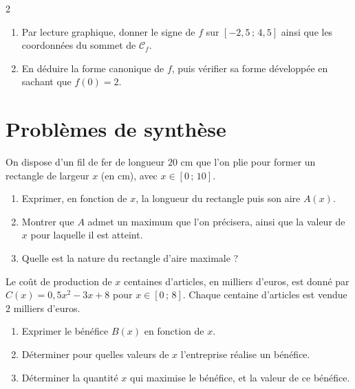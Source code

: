 \documentclass[10pt,a4paper]{article}
\begin{document}
\begin{multicols}{2}
\begin{exo}
\begin{center}
\end{center}

\begin{enumerate}[leftmargin=*]
    \item Par lecture graphique, donner le signe de $f$ sur $[-2{,}5\,;\,4{,}5]$ ainsi que les coordonnées du sommet de $\mathcal{C}_f$.
    \item En déduire la forme canonique de $f$, puis vérifier sa forme développée en sachant que $f(0)=2$.
\end{enumerate}
\end{exo}

\section{Problèmes de synthèse}

\begin{exo}
On dispose d'un fil de fer de longueur $20$ cm que l'on plie pour former un rectangle de largeur $x$ (en cm), avec $x \in [0\,;\,10]$.
\begin{enumerate}[leftmargin=*]
    \item Exprimer, en fonction de $x$, la longueur du rectangle puis son aire $A(x)$.
    \item Montrer que $A$ admet un maximum que l'on précisera, ainsi que la valeur de $x$ pour laquelle il est atteint.
    \item Quelle est la nature du rectangle d'aire maximale ?
\end{enumerate}
\end{exo}

\begin{exo}
Le coût de production de $x$ centaines d'articles, en milliers d'euros, est donné par $C(x) = 0{,}5x^2 - 3x + 8$ pour $x \in [0\,;\,8]$. Chaque centaine d'articles est vendue $2$ milliers d'euros.
\begin{enumerate}[leftmargin=*]
    \item Exprimer le bénéfice $B(x)$ en fonction de $x$.
    \item Déterminer pour quelles valeurs de $x$ l'entreprise réalise un bénéfice.
    \item Déterminer la quantité $x$ qui maximise le bénéfice, et la valeur de ce bénéfice.
\end{enumerate}
\end{exo}

\end{multicols}
\end{document}
